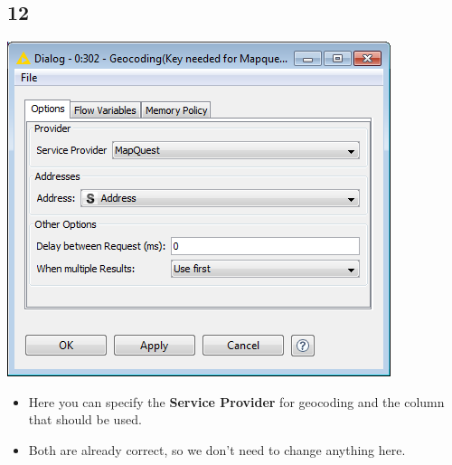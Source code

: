 \documentclass{beamer}
\begin{document}
\subsection{12}
\begin{frame}
	\begin{center}
  		\includegraphics[height=0.6\textheight]{12.png}
	\end{center}
	\begin{itemize}
		\item Here you can specify the \textbf{Service Provider} for geocoding and the column that should be used.
		\item Both are already correct, so we don't need to change anything here.
	\end{itemize}
\end{frame}
\end{document}
